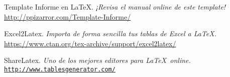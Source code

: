 \documentclass[letterpaper,11pt]{article} %
\begin{document}




\begin{resumen}
	\lipsum[14] %
\end{resumen}






\begin{references}
	Template Informe en \LaTeX.
	\textit{¡Revisa el manual online de este template!} \\
	\url{http://ppizarror.com/Template-Informe/}
	
	Excel2Latex.
	\textit{Importa de forma sencilla tus tablas de Excel a \LaTeX.} \\
	\url{https://www.ctan.org/tex-archive/support/excel2latex/}
	
	ShareLatex.
	\textit{Uno de los mejores editores para \LaTeX\ online.} \\
	\href{https://www.sharelatex.com/?r=298b935f&rm=d&rs=b}{\texttt{http://www.tablesgenerator.com/}}
\end{references}

\end{document}
